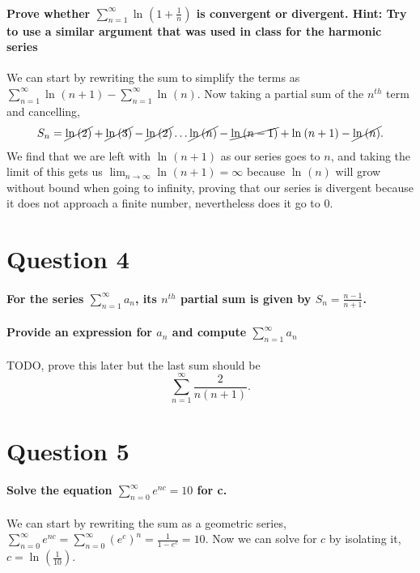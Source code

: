 \documentclass[a4paper]{article}
\begin{document}
\paragraph{Prove whether $ \sum_{ n=1 } ^{ \infty } \ln^{  } \left( 1+\frac{ 1 }{ n }  \right)  $ is convergent or divergent. Hint: Try to use a similar argument that was used in class for the harmonic series \\ }
We can start by rewriting the sum to simplify the terms as $ \sum_{ n=1 } ^{ \infty } \ln^{  } \left( n+1 \right) -\sum_{ n=1 } ^{ \infty } \ln^{  } \left( n \right)  $. Now taking a partial sum of the $ n^{ th } $ term and cancelling,
\begin{align*}
	S_n = \cancel{\ln^{  } \left( 2 \right)} + \cancel{ \ln^{  } \left( 3 \right)  } - \cancel{\ln^{  } \left( 2 \right)} \ldots \cancel{ \ln^{  } \left( n \right)  } - \cancel{ \ln^{  } \left( n-1 \right)  } + \ln^{  } \left( n+1 \right) - \cancel{ \ln^{  } \left( n \right)  }
.\end{align*}
We find that we are left with $ \ln^{  } \left( n+1 \right)  $ as our series goes to $ n $, and taking the limit of this gets us $ \lim_{ n \to \infty} \ln^{  } \left( n+1 \right) =\infty $ because $ \ln^{  } \left( n \right)  $ will grow without bound when going to infinity, proving that our series is divergent because it does not approach a finite number, nevertheless does it go to 0.
\section{Question 4}%
\paragraph{For the series $ \sum_{ n=1 } ^{ \infty } a_n $, its $ n^{ th } $ partial sum is given by $ S_n = \frac{ n-1 }{ n+1 } $. \\ \\ Provide an expression for $ a_n $ and compute $ \sum_{ n=1 } ^{ \infty } a_n $}
TODO, prove this later but the last sum should be 
\[
\sum_{ n=1 } ^{ \infty } \frac{ 2 }{ n\left( n+1 \right)  } 
.\] 
\section{Question 5}%
\paragraph{Solve the equation $ \sum_{ n=0 } ^{ \infty } e^{ nc } =10 $ for c.}
We can start by rewriting the sum as a geometric series, $ \sum_{ n=0 } ^{ \infty } e^{ nc } = \sum_{ n=0 } ^{ \infty } \left( e^{ c } \right)^n = \frac{ 1 }{ 1-e^{ c } } = 10 $. Now we can solve for $ c $ by isolating it, $ c = \ln^{  } \left( \frac{ 1 }{ 10 }  \right)  $.
\end{document}
